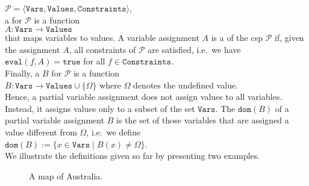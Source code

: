 \hspace*{1.3cm}
 $\mathcal{P} = \langle \texttt{Vars}, \texttt{Values}, \texttt{Constraints} \rangle$, 
\\[0.2cm]
a  for $\mathcal{P}$ is a function 
\\[0.2cm]
\hspace*{1.3cm}
$A: \texttt{Vars} \rightarrow \texttt{Values}$
\\[0.2cm]
that maps variables to values.  A variable assignment $A$ is a  
of the \ac{csp} $\mathcal{P}$  
if, given the assignment $A$, all constraints of $\mathcal{P}$ are satisfied, i.e.~we have
\\[0.2cm]
\hspace*{1.3cm}
$\texttt{eval}(f, A) = \texttt{true}$ \quad for all $f \in \texttt{Constraints}$.
\\[0.2cm]
Finally, a  $B$ for $\mathcal{P}$ is a function 
\\[0.2cm]
\hspace*{1.3cm}
$B: \texttt{Vars} \rightarrow \texttt{Values} \cup \{ \Omega \}$ \quad where $\Omega$ denotes the undefined value.
\\[0.2cm]
Hence, a partial variable assignment does not assign values to all variables.  Instead, it assigns values only
to a subset of the set $\texttt{Vars}$.  The  $\texttt{dom}(B)$ of a partial variable assignment $B$ is the
set of those variables that are assigned a value different from $\Omega$, i.e.~we define
\\[0.2cm]
\hspace*{1.3cm}
$\texttt{dom}(B) := \bigl\{ x \in \texttt{Vars} \mid B(x) \not= \Omega \bigr\}$.
\\[0.2cm]
We illustrate the definitions given so far by presenting two examples.


\begin{figure}[!ht]
  \centering
  \caption{A map of Australia.}
  \label{fig:australia.pdf}
\end{figure}

